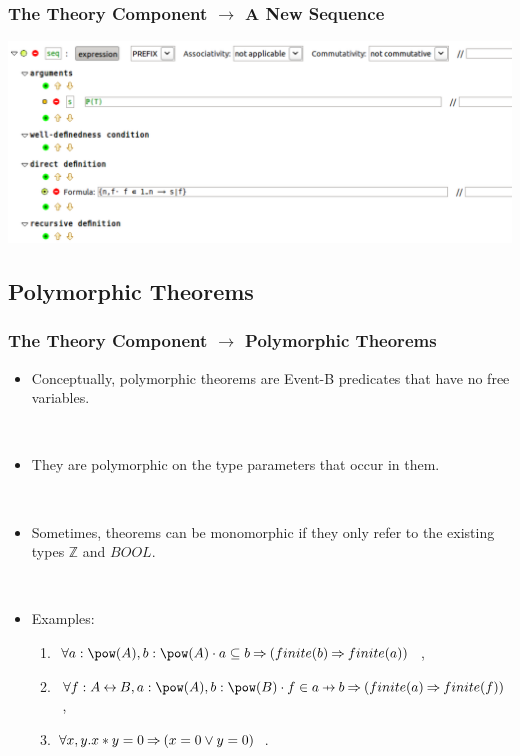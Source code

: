 \documentclass{beamer}
\begin{document}
	\begin{frame}
		\frametitle{The Theory Component $\rightarrow$ A New Sequence}
		\begin{center}
			\includegraphics[scale=0.45]{SeqOpDef}
		\end{center}
	\end{frame}
\subsection{Polymorphic Theorems}
	\begin{frame}
		\frametitle{The Theory Component $\rightarrow$ Polymorphic Theorems}
		\begin{itemize}
			\item Conceptually, polymorphic theorems are Event-B predicates that have no free variables.

~

			\item They are polymorphic on the type parameters that occur in them.

~
			\item Sometimes, theorems can be monomorphic if they only refer to the existing types $\mathbb{Z}$ and $BOOL$.
		
~
	\item Examples:
				\begin{enumerate}
					\item $\forall a:\pow(A), b:\pow(A) \cdot a \subseteq b \limp (finite(b) \limp finite(a))$~,
					\item $\forall f:A \rel B, a:\pow(A), b:\pow(B) \cdot f\in a\pfun b \limp (finite(a) \limp finite(f))$~,
					\item $\forall x, y . x * y = 0 \mathbin\Rightarrow (x=0 \lor y=0)$~.
				\end{enumerate}
		\end{itemize}
	\end{frame}
\end{document}
